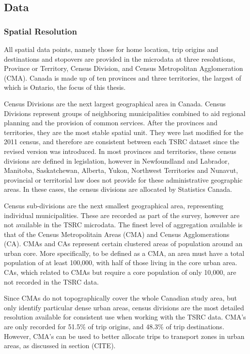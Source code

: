 \subsection{Data}
\label{section:tsrcdata}
\subsubsection{Spatial Resolution}
All spatial data points, namely those for home location, trip origins and destinations and stopovers are provided in the microdata at three resolutions, Province or Territory, Census Division, and Census Metropolitan Agglomeration (CMA). Canada is made up of ten provinces and three territories, the largest of which is Ontario, the focus of this thesis. 

Census Divisions are the next largest geographical area in Canada. Census Divisions represent groups of neighboring municipalities combined to aid regional planning and the provision of common services. After the provinces and territories, they are the most stable spatial unit. They were last modified for the 2011 census, and therefore are consistent between each TSRC dataset since the revised version was introduced. In most provinces and territories, these census divisions are defined in legislation, however in Newfoundland and Labrador, Manitoba, Saskatchewan, Alberta, Yukon, Northwest Territories and Nunavut, provincial or territorial law does not provide for these administrative geographic areas. In these cases, the census divisions are allocated by Statistics Canada.

Census sub-divisions are the next smallest geographical area, representing individual municipalities. These are recorded as part of the survey, however are not available in the TSRC microdata. The finest level of aggregation available is that of the Census Metropolitain Areas (CMA) and Census Agglomerations (CA). CMAs and CAs represent certain clustered areas of population around an urban core. More specifically, to be defined as a CMA, an area must have a total population of at least 100,000, with half of those living in the core urban area. CAs, which related to CMAs but require a core population of only 10,000, are not recorded in the TSRC data. 

Since CMAs do not topographically cover the whole Canadian study area, but only identify particular dense urban areas, census divisions are the most detailed resolution available for consistent use when working with the TSRC data. CMA’s are only recorded for 51.5\% of trip origins, and 48.3\% of trip destinations. However, CMA's can be used to better allocate trips to transport zones in urban areas, as discussed in section (CITE).

